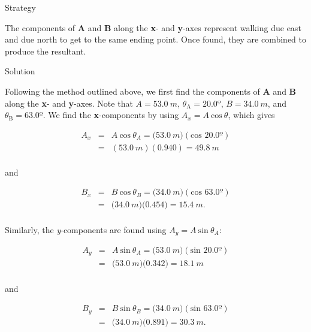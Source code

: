 \documentclass[
]{book}
\begin{document}
{Strategy}

The components of \(\mathbf{A}{}\) and \(\mathbf{B}{}\) along the \textbf{x}- and
\textbf{y}-axes represent walking due east and due north to get to the same
ending point. Once found, they are combined to produce the resultant.

{Solution}

Following the method outlined above, we first find the components of
\(\mathbf{A}{}\) and \(\mathbf{B}{}\) along the \textbf{x}- and \textbf{y}-axes. Note
that \(A = 53.0\ m\), \(\theta_{\text{A}} = 20.0º\), \(B = 34.0\ m\), and
\({\theta_{\text{B}} = 63.0º}{}\). We find the \textbf{x}-components by using
\({{A_{x} = A}\ \text{cos}\ \theta}{}\), which gives

\leavevmode{}%
\[\begin{array}{lll}
A_{x} & = & {A\ \text{cos}\ {\theta_{A} = (}\text{53.}0\ m)(\text{cos\ 20.0º})} \\
 & = & {(\text{53.}0\ m)(0\text{.940}) = \text{49.}8\ m} \\
\end{array}\]

and

\leavevmode{}%
\[\begin{array}{lll}
B_{x} & = & {B\ \text{cos}\ {\theta_{B} = (}\text{34}\text{.}0\ m)(\text{cos\ 63.0º})} \\
 & = & {{(}\text{34}\text{.}0\ m)(0\text{.}\text{454}{) = \text{15}}\text{.}4\ m\text{.}} \\
\end{array}{}\]

Similarly, the \emph{y}-components are found using
\({{A_{y} = A}\ \text{sin}\ \theta_{A}}{}\):

\leavevmode{}%
\[\begin{array}{lll}
A_{y} & = & {A\ \text{sin}{\ \theta_{A} = (}\text{53}\text{.}0\ m)(\text{sin\ 20.0º})} \\
 & = & {{(}\text{53}\text{.}0\ m)(0\text{.}\text{342}{) = \text{18}}\text{.}1\ m} \\
\end{array}{}\]

and

\leavevmode{}%
\[\begin{array}{lll}
B_{y} & = & {B\ \text{sin}\ {\theta_{B} = (}\text{34}\text{.}0\ m)(\text{sin\ 63}\text{.}0º)} \\
 & = & {{(}\text{34}\text{.}0\ m)(0\text{.}\text{891}{) = \text{30}}\text{.}3\ m\text{.}} \\
\end{array}{}\]
\end{document}
